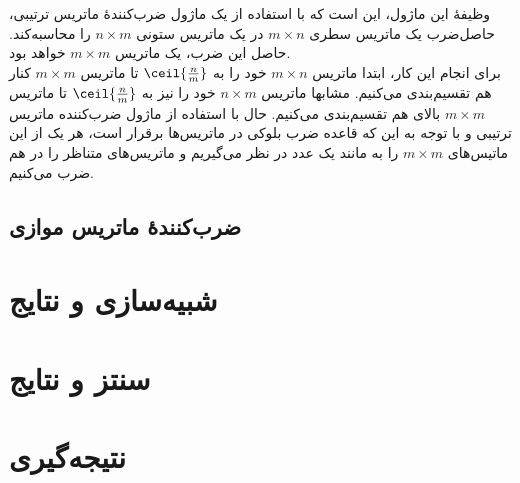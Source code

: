 \documentclass[conference]{IEEEtran-ModifiedForMVIP}
\begin{document}
وظیفهٔ این ماژول، این است که با استفاده از یک ماژول ضرب‌کنندهٔ ماتریس ترتیبی، حاصل‌ضرب یک ماتریس سطری
$m \times n$
در یک ماتریس ستونی
$n \times m$
را محاسبه‌کند.
حاصل این ضرب، یک ماتریس
$m \times m$
خواهد بود.
\\
برای انجام این‌ کار، ابتدا ماتریس 
$m \times n$
خود را به 
$\ceil{\frac{n}{m}}$
تا ماتریس 
$m \times m$
کنار هم تقسیم‌بندی می‌کنیم.
مشابها ماتریس 
$n \times m$
خود را نیز به 
$\ceil{\frac{n}{m}}$
تا ماتریس 
$m \times m$
بالای هم تقسیم‌بندی می‌کنیم.
حال با استفاده از ماژول ضرب‌کننده ماتریس ترتیبی و با توجه به  این که قاعده ضرب بلوکی در ماتریس‌ها برقرار است، هر یک از این ماتیس‌های 
$m \times m$
را به مانند یک عدد در نظر می‌گیریم و ماتریس‌های متناظر را در هم ضرب می‌کنیم.

\subsection{
    ضرب‌کنندهٔ ماتریس موازی
}

\section{شبیه‌سازی و نتایج}

\section{سنتز و نتایج}

\section{نتیجه‌گیری}



\end{document}
